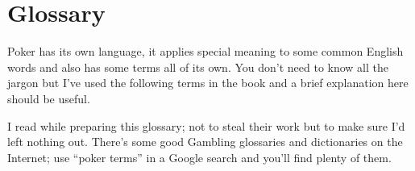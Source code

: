 \chapter{Glossary}




Poker has its own language, it applies special meaning to some
common English words and also has some terms all of its own. You
don't need to know all the jargon but I've used the following terms
in the book and a brief explanation here should be useful.

I read \citep{AllanMackay} while preparing this glossary; not to steal
their work but to make sure I'd left nothing out. There's some good
Gambling glossaries and dictionaries on the Internet; use ``poker
terms'' in a Google search and you'll find plenty of them.

